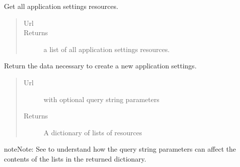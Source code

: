 \documentclass[letterpaper,10pt,english]{sphinxmanual}
\begin{document}
\begin{fulllineitems}
\begin{fulllineitems}
\end{fulllineitems}


\begin{fulllineitems}
\label{api:onlinelinguisticdatabase.controllers.applicationsettings.ApplicationsettingsController.index}
Get all application settings resources.
\begin{quote}\begin{description}
\item[{Url }] \leavevmode
{}

\item[{Returns}] \leavevmode
a list of all application settings resources.

\end{description}\end{quote}

\end{fulllineitems}


\begin{fulllineitems}
\label{api:onlinelinguisticdatabase.controllers.applicationsettings.ApplicationsettingsController.new}
Return the data necessary to create a new application settings.
\begin{quote}\begin{description}
\item[{Url }] \leavevmode
{} with optional query string parameters

\item[{Returns}] \leavevmode
A dictionary of lists of resources

\end{description}\end{quote}

\begin{notice}{note}{Note:}
See  to understand how the query
string parameters can affect the contents of the lists in the
returned dictionary.
\end{notice}

\end{fulllineitems}


\end{fulllineitems}
\end{document}
